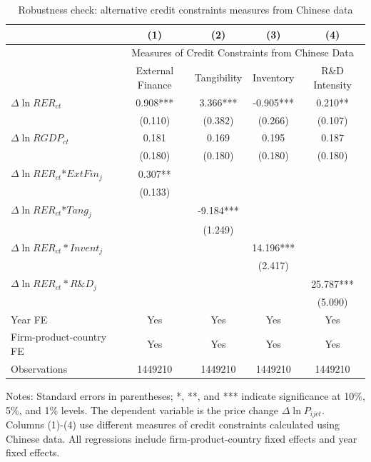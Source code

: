\documentclass[12pt]{article}
\begin{document}
\begin{table}[htbp]
	\centering
	\caption{Robustness check: alternative credit constraints measures from Chinese data}
	\begin{threeparttable}
	\begin{tabular}{lcccc}
		\toprule
		& (1)   & (2)   & (3)   & (4) \\
		\midrule
		& \multicolumn{4}{c}{Measures of Credit Constraints from Chinese Data} \\
		& External Finance & Tangibility & Inventory & R\&D Intensity \\
		\midrule
		$\Delta \ln RER_{ct}$ & 0.908*** & 3.366*** & -0.905*** & 0.210** \\
		& (0.110) & (0.382)	& (0.266) & (0.107)\\
		$\Delta \ln RGDP_{ct}$ & 0.181 & 0.169 & 0.195 & 0.187\\
		& (0.180) & (0.180) & (0.180) & (0.180) \\
		$\Delta \ln RER_{ct}$*$ExtFin_{j}$ & 0.307** &       &       &  \\
		& (0.133) &       &       &  \\
		$\Delta \ln RER_{ct}$*$Tang_{j}$ &       & -9.184*** &       &  \\
		&       & (1.249) &       &  \\
		$\Delta \ln RER_{ct}*Invent_{j}$ &       &       & 14.196*** &  \\
		&       &       & (2.417) &  \\
		$\Delta \ln RER_{ct}*R\&D_{j}$ &       &       &       & 25.787*** \\
		&       &       &       & (5.090) \\
		Year FE  & Yes   & Yes   & Yes   & Yes \\
		Firm-product-country FE & Yes   & Yes   & Yes   & Yes \\
		Observations & 1449210 & 1449210 & 1449210 & 1449210 \\
		\bottomrule
	\end{tabular}
	\begin{tablenotes}
		\footnotesize
		\item[Notes:]  Standard errors in parentheses; *, **, and *** indicate significance at 10\%, 5\%, and 1\% levels. The dependent variable is the price change $\Delta \ln P_{ijct}$. Columns (1)-(4) use different measures of credit constraints calculated using Chinese data. All regressions include firm-product-country fixed effects and year fixed effects.
	\end{tablenotes}
	\end{threeparttable}
        \label{tab.robust.credit}
\end{table}
\end{document}
